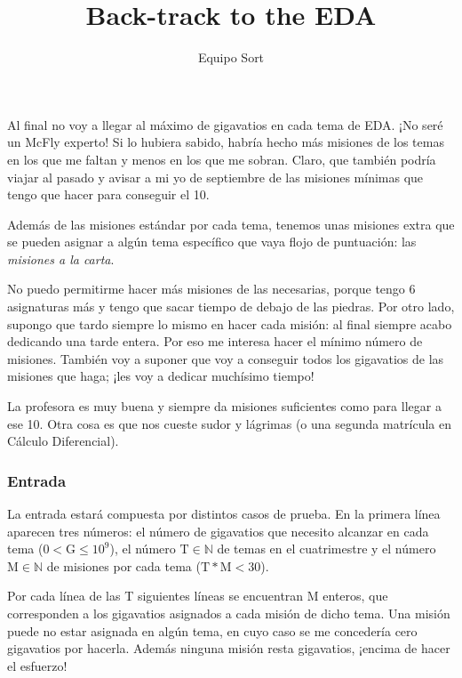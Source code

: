 \documentclass{article}
\title{Back-track to the EDA}
\author{Equipo Sort}
\date{}
\begin{document}
	\maketitle
	
	Al final no voy a llegar al máximo de gigavatios en cada tema de EDA. ¡No seré un McFly experto! Si lo hubiera sabido, habría hecho más misiones de los temas en los que me faltan y menos en los que me sobran. Claro, que también podría viajar al pasado y avisar a mi yo de septiembre de las misiones mínimas que tengo que hacer para conseguir el 10.
	
	
	Además de las misiones estándar por cada tema, tenemos unas misiones extra que se pueden asignar a algún tema específico que vaya flojo de puntuación: las \textit{misiones a la carta}.
	
	No puedo permitirme hacer más misiones de las necesarias, porque tengo 6 asignaturas más y tengo que sacar tiempo de debajo de las piedras. Por otro lado, supongo que tardo siempre lo mismo en hacer cada misión: al final siempre acabo dedicando una tarde entera. Por eso me interesa hacer el mínimo número de misiones. También voy a suponer que voy a conseguir todos los gigavatios de las misiones que haga; ¡les voy a dedicar muchísimo tiempo!
	
	La profesora es muy buena y siempre da misiones suficientes como para llegar a ese 10. Otra cosa es que nos cueste sudor y lágrimas (o una segunda matrícula en Cálculo Diferencial).\\
	
	\subsubsection*{Entrada}
	
	La entrada estará compuesta por distintos casos de prueba. En la primera línea aparecen tres números: el número de gigavatios que necesito alcanzar en cada tema ($0<\text{G}\leq 10^9$), el número $\text{T}\in\mathbb{N}$ de temas en el cuatrimestre y el número $\text{M}\in\mathbb{N}$ de misiones por cada tema ($\text{T}*\text{M}<30$).
	
	Por cada línea de las T siguientes líneas se encuentran M enteros, que corresponden a los gigavatios asignados a cada misión de dicho tema. Una misión puede no estar asignada en algún tema, en cuyo caso se me concedería cero gigavatios por hacerla. Además ninguna misión resta gigavatios, ¡encima de hacer el esfuerzo!
	
\end{document}
